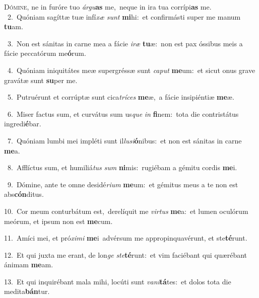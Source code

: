 \lettrine{\initial\textcolor{\initialcolor}{D}}{ómine,} ne in furóre tuo \textit{ár}\-\textit{gu}\textbf{as} me,~\star neque in ira tua corrípi\textbf{as} me.\\
{\numbfont\textcolor{\numbcolor}{~2.}}~Quóniam sagíttæ tuæ infí\textit{xæ} \textit{sunt} \textbf{mi}\-hi:~\star et confirmásti super me manum \textbf{tu}\-am.\par
{\numbfont\textcolor{\numbcolor}{~3.}}~Non est sánitas in carne mea a fácie \textit{i}\-\textit{ræ} \textbf{tu}\-æ:~\star non est pax óssibus meis a fácie peccatórum me\-\textbf{ó}\-rum.\par
{\numbfont\textcolor{\numbcolor}{~4.}}~Quóniam iniquitátes meæ supergréssæ sunt \textit{ca}\-\textit{put} \textbf{me}\-um:~\star et sicut onus grave gravátæ sunt \textbf{su}\-per me.\par
{\numbfont\textcolor{\numbcolor}{~5.}}~Putruérunt et corrúptæ sunt cica\-\textit{trí}\-\textit{ces} \textbf{me}\-æ,~\star a fácie insipiéntiæ \textbf{me}\-æ.\par
{\numbfont\textcolor{\numbcolor}{~6.}}~Miser factus sum, et curvátus sum us\textit{que} \textit{in} \textbf{fi}\-nem:~\star tota die contristátus ingredi\-\textbf{é}\-bar.\par
{\numbfont\textcolor{\numbcolor}{~7.}}~Quóniam lumbi mei impléti sunt il\-\textit{lu}\-\textit{si}\textbf{ó}nibus:~\star et non est sánitas in carne \textbf{me}\-a.\par
{\numbfont\textcolor{\numbcolor}{~8.}}~Afflíctus sum, et humiliá\textit{tus} \textit{sum} \textbf{ni}\-mis:~\star rugiébam a gémitu cordis \textbf{me}\-i.\par
{\numbfont\textcolor{\numbcolor}{~9.}}~Dómine, ante te omne desidé\-\textit{ri}\-\textit{um} \textbf{me}\-um:~\star et gémitus meus a te non est abs\-\textbf{cón}\-ditus.\par
{\numbfont\textcolor{\numbcolor}{10.}}~Cor meum conturbátum est,~\dagger derelíquit me \textit{vir}\-\textit{tus} \textbf{me}\-a:~\star et lumen oculórum meórum, et ipsum non est \textbf{me}\-cum.\par
{\numbfont\textcolor{\numbcolor}{11.}}~Amíci mei, et pró\-\textit{xi}\-\textit{mi} \textbf{me}\-i~\star advérsum me appropinquavérunt, et ste\-\textbf{té}\-runt.\par
{\numbfont\textcolor{\numbcolor}{12.}}~Et qui juxta me erant, de lon\textit{ge} \textit{ste}\-\textbf{té}runt:~\star et vim faciébant qui quærébant ánimam \textbf{me}\-am.\par
{\numbfont\textcolor{\numbcolor}{13.}}~Et qui inquirébant mala mihi, locúti sunt \textit{va}\-\textit{ni}\textbf{tá}tes:~\star et dolos tota die medita\-\textbf{bán}\-tur.\par
